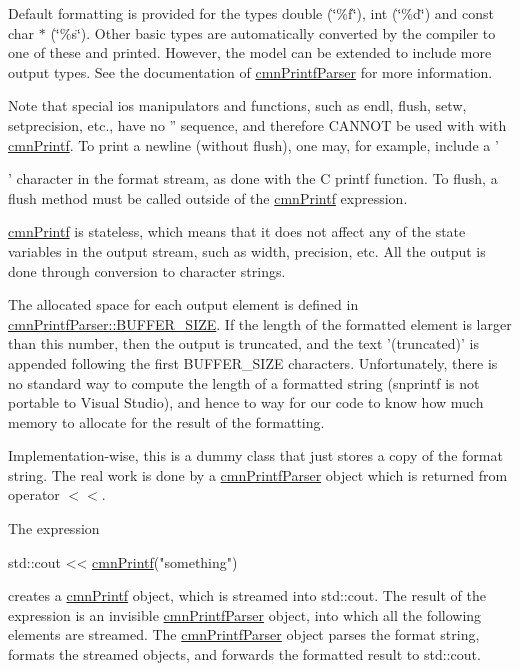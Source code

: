 Default formatting is provided for the types double (\char`\"{}\%f\char`\"{}), int (\char`\"{}\%d\char`\"{}) and const char $\ast$ (\char`\"{}\%s\char`\"{}). Other basic types are automatically converted by the compiler to one of these and printed. However, the model can be extended to include more output types. See the documentation of \hyperlink{classcmn_printf_parser}{cmn\-Printf\-Parser} for more information.

Note that special ios manipulators and functions, such as endl, flush, setw, setprecision, etc., have no '' sequence, and therefore C\-A\-N\-N\-O\-T be used with with \hyperlink{classcmn_printf}{cmn\-Printf}. To print a newline (without flush), one may, for example, include a '\par
' character in the format stream, as done with the C printf function. To flush, a flush method must be called outside of the \hyperlink{classcmn_printf}{cmn\-Printf} expression.

\hyperlink{classcmn_printf}{cmn\-Printf} is stateless, which means that it does not affect any of the state variables in the output stream, such as width, precision, etc. All the output is done through conversion to character strings.

The allocated space for each output element is defined in {\ttfamily \hyperlink{classcmn_printf_parser_a2dbb69cb7aa030799fad9b8d7a1857d5af9f1fd3238867d902ee69418278958a9}{cmn\-Printf\-Parser\-::\-B\-U\-F\-F\-E\-R\-\_\-\-S\-I\-Z\-E}}. If the length of the formatted element is larger than this number, then the output is truncated, and the text '(truncated)' is appended following the first B\-U\-F\-F\-E\-R\-\_\-\-S\-I\-Z\-E characters. Unfortunately, there is no standard way to compute the length of a formatted string (snprintf is not portable to Visual Studio), and hence to way for our code to know how much memory to allocate for the result of the formatting.

Implementation-\/wise, this is a dummy class that just stores a copy of the format string. The real work is done by a \hyperlink{classcmn_printf_parser}{cmn\-Printf\-Parser} object which is returned from operator $<$$<$.

The expression 
\begin{DoxyCode}
std::cout << \hyperlink{classcmn_printf_af834e91520896f203bf74171a852e38f}{cmnPrintf}(\textcolor{stringliteral}{"something"})
\end{DoxyCode}


creates a \hyperlink{classcmn_printf}{cmn\-Printf} object, which is streamed into std\-::cout. The result of the expression is an invisible \hyperlink{classcmn_printf_parser}{cmn\-Printf\-Parser} object, into which all the following elements are streamed. The \hyperlink{classcmn_printf_parser}{cmn\-Printf\-Parser} object parses the format string, formats the streamed objects, and forwards the formatted result to std\-::cout. 

